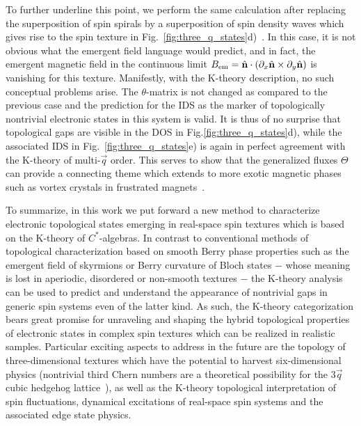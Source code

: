 \documentclass[
    10pt,
    aps,
    prl,
    twocolumn,
    floatfix,
    superscriptaddress
]{revtex4-2}
\newcommand{\SupplementalMaterial}{\cite{Note1}}
\begin{document}
To further underline this point, we perform the same calculation after replacing the superposition of spin spirals by a superposition of spin density waves which gives rise to the spin texture in Fig.~\ref{fig:three_q_states}d)~\SupplementalMaterial. 
In this case, it is not obvious what the emergent field language would predict, and  
in fact, the emergent magnetic field in the continuous limit  $B_\mathrm{em} = \hat{\mathbf{n}} \cdot(\partial_x \hat{\mathbf{n}} \times \partial_y \hat{\mathbf{n}})$ is vanishing for this texture.
Manifestly, with the K-theory description, no such conceptual problems arise.
The $\theta$-matrix is not changed as compared to the previous case and the prediction for the IDS as the marker of topologically nontrivial electronic states in this system is valid. 
It is thus of no surprise that topological gaps are visible in the DOS in Fig.\ref{fig:three_q_states}d), while the associated IDS in Fig.~\ref{fig:three_q_states}e) is again in perfect agreement with the K-theory of multi-$\vec{q}$ order.
This serves to show that the generalized fluxes $\Theta$ can provide a connecting theme which extends to more exotic magnetic phases such as vortex crystals in frustrated magnets~\cite{Wang2015}.


To summarize, in this work we put forward a new method to characterize electronic topological states emerging in real-space spin textures which is based on the K-theory of $C^\ast$-algebras.
In contrast to conventional methods of topological characterization based on smooth Berry phase properties such as the emergent field of skyrmions or Berry curvature of Bloch states $-$ whose meaning is lost in aperiodic, disordered or non-smooth textures $-$ the K-theory analysis can be used to predict and understand the appearance of nontrivial gaps in generic spin systems even of the latter kind. 
As such, the K-theory categorization bears great promise for unraveling and shaping the hybrid topological properties of electronic states in complex spin textures which can be realized in realistic samples. 
Particular exciting aspects to address in the future are the topology of three-dimensional textures which have the potential to harvest six-dimensional physics (nontrivial third Chern numbers are a theoretical possibility for the 3$\vec{q}$ cubic hedgehog lattice~\SupplementalMaterial), as well as the K-theory topological interpretation of spin fluctuations, dynamical excitations of real-space spin systems and the associated edge state physics.
\end{document}
